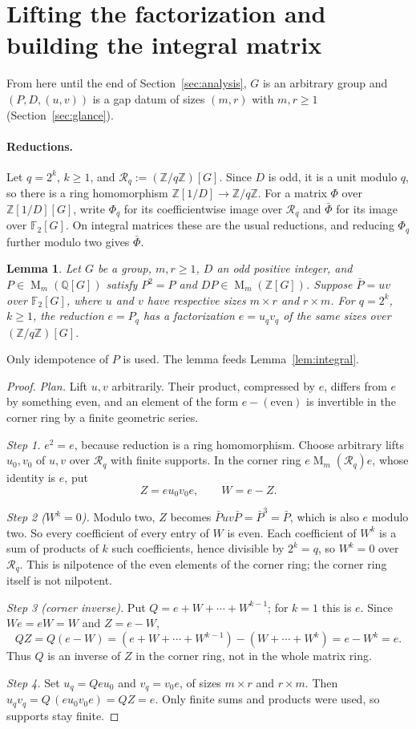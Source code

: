\documentclass[11pt]{article}
\newtheorem{lemma}[theorem]{Lemma}
\theoremstyle{remark}
\numberwithin{equation}{section}
\newcommand{\F}{\mathbb F}
\newcommand{\Z}{\mathbb Z}
\newcommand{\Q}{\mathbb Q}
\newcommand{\Mat}{\operatorname{M}}
\begin{document}
\section{Lifting the factorization and building the integral matrix}
\label{sec:lifting}

From here until the end of Section~\ref{sec:analysis}, $G$ is an arbitrary group and $(P,D,(u,v))$ is a gap datum of sizes $(m,r)$ with $m,r\ge1$ (Section~\ref{sec:glance}).

\paragraph{Reductions.}
Let $q=2^k$, $k\ge1$, and $\mathcal R_q:=(\Z/q\Z)[G]$. Since $D$ is odd, it is a unit modulo $q$, so there is a ring homomorphism $\Z[1/D]\to\Z/q\Z$. For a matrix $\Phi$ over $\Z[1/D][G]$, write $\Phi_q$ for its coefficientwise image over $\mathcal R_q$ and $\bar\Phi$ for its image over $\F_2[G]$. On integral matrices these are the usual reductions, and reducing $\Phi_q$ further modulo two gives $\bar\Phi$.

\begin{lemma}\label{lem:lift}
Let $G$ be a group, $m,r\ge1$, $D$ an odd positive integer, and
$P\in\Mat_m(\Q[G])$ satisfy $P^2=P$ and
$DP\in\Mat_m(\Z[G])$. Suppose $\bar P=uv$ over $\F_2[G]$, where $u$ and $v$
have respective sizes $m\times r$ and $r\times m$. For $q=2^k$,
$k\ge1$, the reduction $e=P_q$ has a factorization
$e=u_qv_q$ of the same sizes over $(\Z/q\Z)[G]$.
\end{lemma}

Only idempotence of $P$ is used. The lemma feeds Lemma~\ref{lem:integral}.

\begin{proof}
\emph{Plan.} Lift $u,v$ arbitrarily. Their product, compressed by $e$, differs from $e$ by something even, and an element of the form $e-(\text{even})$ is invertible in the corner ring by a finite geometric series.

\emph{Step 1.} $e^2=e$, because reduction is a ring homomorphism. Choose arbitrary lifts $u_0,v_0$ of $u,v$ over $\mathcal R_q$ with finite supports. In the corner ring $e\Mat_m(\mathcal R_q)e$, whose identity is $e$, put
\[
 Z=eu_0v_0e,\qquad W=e-Z.
\]

\emph{Step 2 ($W^k=0$).} Modulo two, $Z$ becomes $\bar Puv\bar P=\bar P^3=\bar P$, which is also $e$ modulo two. So every coefficient of every entry of $W$ is even. Each coefficient of $W^k$ is a sum of products of $k$ such coefficients, hence divisible by $2^k=q$, so $W^k=0$ over $\mathcal R_q$. This is nilpotence of the even elements of the corner ring; the corner ring itself is not nilpotent.

\emph{Step 3 (corner inverse).} Put $Q=e+W+\cdots+W^{k-1}$; for $k=1$ this is $e$. Since $We=eW=W$ and $Z=e-W$,
\[
 QZ=Q(e-W)=(e+W+\cdots+W^{k-1})-(W+\cdots+W^{k})=e-W^k=e.
\]
Thus $Q$ is an inverse of $Z$ in the corner ring, not in the whole matrix ring.

\emph{Step 4.} Set $u_q=Qeu_0$ and $v_q=v_0e$, of sizes $m\times r$ and $r\times m$. Then $u_qv_q=Q\,(eu_0v_0e)=QZ=e$. Only finite sums and products were used, so supports stay finite.
\end{proof}
\end{document}
